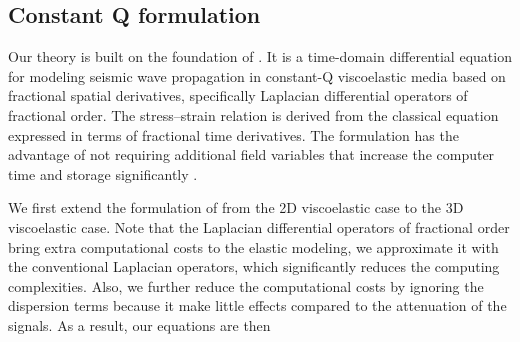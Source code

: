 \documentclass{paris17}
\begin{document}


\subsection{Constant Q formulation}

Our theory is built on the foundation of \cite[]{zhu2014theory}. It is a time-domain differential equation for modeling seismic wave propagation in constant-Q viscoelastic media based on fractional spatial derivatives, specifically Laplacian differential operators of fractional order.  The stress–strain relation is derived from the classical equation expressed in terms of fractional time derivatives. The formulation has the advantage of not requiring additional field variables that increase the computer time and storage significantly \cite[]{zhu2014theory}.

We first extend the formulation of \cite[]{zhu2014theory} from the 2D viscoelastic case to the 3D viscoelastic case. Note that the Laplacian differential operators of fractional order bring extra computational costs to the elastic modeling, we approximate it with the conventional Laplacian operators, which significantly reduces the computing complexities. Also, we further reduce the computational costs by ignoring the dispersion terms because it make little effects compared to the attenuation of the signals. As a result, our equations are then
\end{document}
